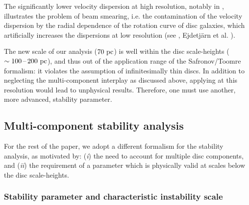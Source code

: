 \documentclass[useAMS,usenatbib]{mnras}
\begin{document}
The significantly lower velocity dispersion at high resolution, notably in \htwo, illustrates the problem of beam smearing, i.e. the contamination of the velocity dispersion by the radial dependence of the rotation curve of disc galaxies, which artificially increases the dispersions at low resolution (see \citealt{Bacchini2019, Bacchini2020}, Ejdetj\"arn et al. \inprep).

The new scale of our analysis ($70 \mathrm{~pc}$) is well within the disc scale-heights ($\sim 100\textrm{\,--\,} 200 \mathrm{~pc}$), and thus out of the application range of the Safronov/Toomre formalism: it violates the assumption of infinitesimally thin discs. In addition to neglecting the multi-component interplay as discussed above, applying  at this resolution would lead to unphysical results. Therefore, one must use another, more advanced, stability parameter.

\subsection{Multi-component stability analysis}

For the rest of the paper, we adopt a different formalism for the stability analysis, as motivated by: (\emph{i}) the need to account for multiple disc components, and (\emph{ii}) the requirement of a parameter which is physically valid at scales below the disc scale-heights.

\subsubsection{Stability parameter and characteristic instability scale}
\label{sec:qrf}
\end{document}
